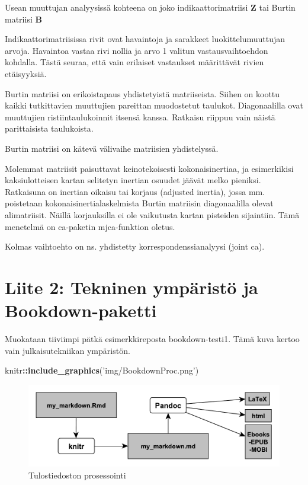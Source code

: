 \documentclass[
  finnish,
]{book}
\newenvironment{Shaded}{\begin{snugshade}}{\end{snugshade}}
\newcommand{\KeywordTok}[1]{\textcolor[rgb]{0.13,0.29,0.53}{\textbf{#1}}}
\newcommand{\NormalTok}[1]{#1}
\newcommand{\OperatorTok}[1]{\textcolor[rgb]{0.81,0.36,0.00}{\textbf{#1}}}
\newcommand{\StringTok}[1]{\textcolor[rgb]{0.31,0.60,0.02}{#1}}
\begin{document}
Usean muuttujan analyysissä kohteena on joko indikaattorimatriisi \(\boldsymbol{Z}\) tai
Burtin matriisi \(\boldsymbol{B}\)

Indikaattorimatriisissa rivit ovat havaintoja ja sarakkeet luokittelumuuttujan arvoja.
Havaintoa vastaa rivi nollia ja arvo 1 valitun vastausvaihtoehdon kohdalla. Tästä seuraa,
että vain erilaiset vastaukset määrittävät rivien etäisyyksiä.

Burtin matriisi on erikoistapaus yhdistetyistä matriiseista. Siihen on koottu kaikki tutkittavien
muuttujien pareittan muodostetut taulukot. Diagonaalilla ovat muuttujien ristiintaulukoinnit
itsensä kanssa. Ratkaisu riippuu vain näistä parittaisista taulukoista.

Burtin matriisi on kätevä välivaihe matriisien yhdistelyssä.

Molemmat matriisit paisuttavat keinotekoisesti kokonaisinertiaa, ja esimerkikisi kaksiulotteisen kartan
selitetyn inertian osuudet jäävät melko pieniksi. Ratkaisuna on inertian oikaisu tai korjaus
(adjusted inertia), jossa mm. poistetaan kokonaisinertialaskelmista Burtin matriisin
diagonaalilla olevat alimatriisit. Näillä korjauksilla ei ole vaikutusta kartan pisteiden
sijaintiin. Tämä menetelmä on ca-paketin mjca-funktion oletus.

Kolmas vaihtoehto on ns. yhdistetty korrespondenssianalyysi (joint ca).

\hypertarget{liite-2-tekninen-ympuxe4ristuxf6-ja-bookdown-paketti}{%
\chapter*{Liite 2: Tekninen ympäristö ja Bookdown-paketti}\label{liite-2-tekninen-ympuxe4ristuxf6-ja-bookdown-paketti}}

Muokataan tiiviimpi pätkä esimerkkireposta bookdown-testi1. Tämä kuva kertoo vain
julkaisutekniikan ympäristön.

\begin{Shaded}
\begin{Highlighting}[]
\NormalTok{knitr}\OperatorTok{::}\KeywordTok{include_graphics}\NormalTok{(}\StringTok{'img/BookdownProc.png'}\NormalTok{)}
\end{Highlighting}
\end{Shaded}

\begin{figure}

{\centering \includegraphics[width=0.7\linewidth]{img/BookdownProc} 

}

\caption{Tulostiedoston prosessointi}\label{fig:L3bdprocess1}
\end{figure}
\end{document}
